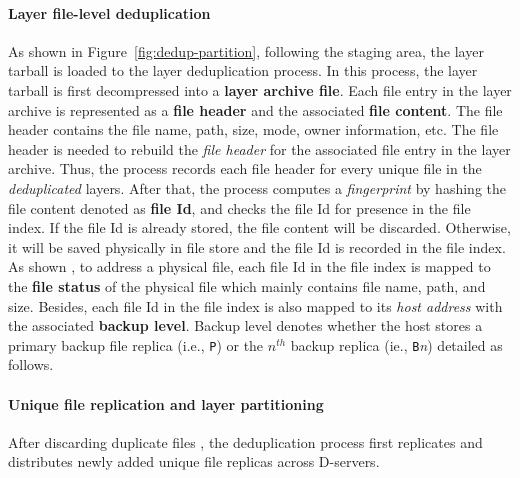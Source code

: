 \paragraph{Layer file-level deduplication}
As shown in Figure~\ref{fig:dedup-partition}, following the staging area, the layer tarball is loaded to the layer deduplication process.
In this process, the layer tarball is first decompressed into a \textbf{layer archive file}.
Each file entry in the layer archive is represented as a \textbf{file header} and the associated \textbf{file content}.
The file header contains the file name, path, size, mode, owner information, etc.
The file header is needed to rebuild the \emph{file header} for 
the associated file entry in the layer archive.
Thus, 
the process records each file header for every unique file in the \emph{deduplicated} layers. 
After that,
the process computes a \emph{fingerprint} by hashing the file content denoted as \textbf{file Id}, 
and checks the file Id for presence in the file index.
If the file Id is already stored, the file content will be discarded. 
Otherwise, it will be saved physically in file store and the file Id is recorded in the file index.
As shown ,
to address a physical file, 
each file Id in the file index is mapped to the 
\textbf{file status}
%
%
of the physical file which mainly contains file name, path, and size.
Besides, each file Id in the file index is also mapped to its \emph{host address} with the associated \textbf{backup level}.
Backup level denotes whether the host stores a primary backup file replica (i.e., \texttt{P}) or the $n^{th}$ backup replica (ie., \texttt{B}\emph{n}) detailed as follows.



\paragraph{Unique file replication and layer partitioning}


After discarding duplicate files%
, the deduplication process first replicates and distributes newly added unique file replicas across D-servers.


